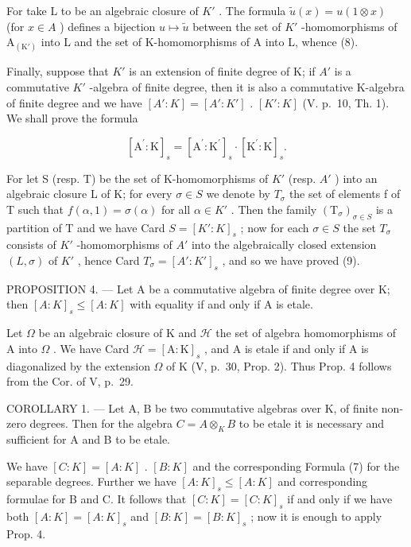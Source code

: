 For take L to be an algebraic closure of \(K'\) . The formula \(\tilde{u}(x)=u(1\otimes x)\) (for \(x\in A\) ) defines a bijection \(u\mapsto\tilde{u}\) between the set of \(K'\) -homomorphisms of \(\mathrm{A}_{(\mathrm{K}')}\) into L and the set of K-homomorphisms of A into L, whence (8).

Finally, suppose that \(K'\) is an extension of finite degree of K; if \(A'\) is a commutative \(K'\) -algebra of finite degree, then it is also a commutative K-algebra of finite degree and we have \([A':K] = [A':K']\) . \([K':K]\) (V. p.~10, Th. 1). We shall prove the formula

\[
[ \mathrm{A} ^ {\prime}: \mathrm{K} ] _ {s} = [ \mathrm{A} ^ {\prime}: \mathrm{K} ^ {\prime} ] _ {s} \cdot [ \mathrm{K} ^ {\prime}: \mathrm{K} ] _ {s}.\tag{9}
\]

For let S (resp. T) be the set of K-homomorphisms of \(K'\) (resp. \(A'\) ) into an algebraic closure L of K; for every \(\sigma \in S\) we denote by \(T_{\sigma}\) the set of elements f of T such that \(f(\alpha, 1) = \sigma(\alpha)\) for all \(\alpha \in K'\) . Then the family \((\mathrm{T}_{\sigma})_{\sigma \in S}\) is a partition of T and we have Card \(S = [K': K]_{s}\) ; now for each \(\sigma \in S\) the set \(T_{\sigma}\) consists of \(K'\) -homomorphisms of \(A'\) into the algebraically closed extension \((L, \sigma)\) of \(K'\) , hence Card \(T_{\sigma} = [A': K']_{s}\) , and so we have proved (9).

PROPOSITION 4. --- Let A be a commutative algebra of finite degree over K; then \([A:K]_{s} \leqslant [A:K]\) with equality if and only if A is etale.

Let \(\Omega\) be an algebraic closure of K and \(\mathcal{H}\) the set of algebra homomorphisms of A into \(\Omega\) . We have Card \(\mathcal{H} = [\mathrm{A}:\mathrm{K}]_s\) , and A is etale if and only if A is diagonalized by the extension \(\Omega\) of K (V, p.~30, Prop. 2). Thus Prop. 4 follows from the Cor. of V, p.~29.

COROLLARY 1. --- Let A, B be two commutative algebras over K, of finite non-zero degrees. Then for the algebra \(C = A \otimes_{K} B\) to be etale it is necessary and sufficient for A and B to be etale.

We have \([C:K]=[A:K]\) . \([B:K]\) and the corresponding Formula (7) for the separable degrees. Further we have \([A:K]_{s}\leqslant[A:K]\) and corresponding formulae for B and C. It follows that \([C:K]=[C:K]_{s}\) if and only if we have both \([A:K]=[A:K]_{s}\) and \([B:K]=[B:K]_{s}\) ; now it is enough to apply Prop. 4.

